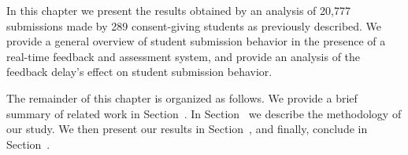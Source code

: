 In this chapter we present the results obtained by an analysis of 20,777
submissions made by 289 consent-giving students as previously described. We
provide a general overview of student submission behavior in the presence of a
real-time feedback and assessment system, and provide an analysis of the
feedback delay's effect on student submission behavior.

The remainder of this chapter is organized as follows. We provide a brief
summary of related work in Section~. In
Section~ we describe the methodology of our study. We
then present our results in Section~, and finally,
conclude in Section~.
